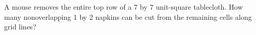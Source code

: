 A mouse removes the entire top row of a 7 by 7 unit-square tablecloth. How many nonoverlapping 1 by 2 napkins can be cut from the remaining cells along grid lines?
